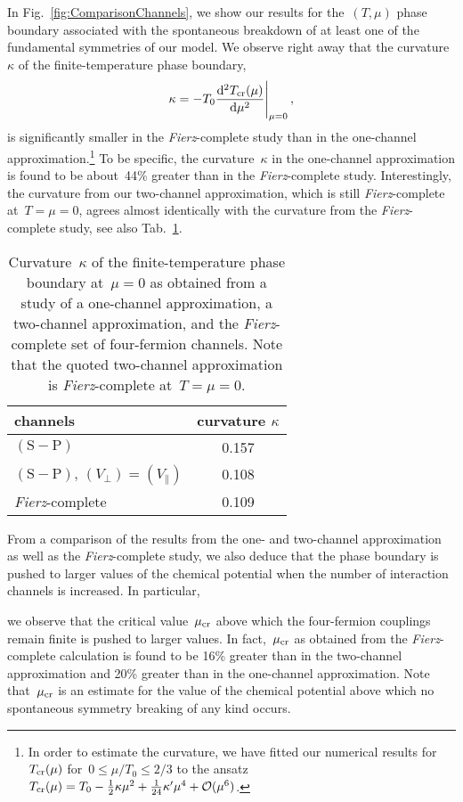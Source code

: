 \documentclass[prd,english,preprintnumbers,amsmath,amssymb,nofootinbib,twocolumn,superscriptaddress]{revtex4-1}
\newcommand{\be}{\begin{eqnarray}}
\newcommand{\ee}{\end{eqnarray}}
\begin{document}
{In Fig.~\ref{fig:ComparisonChannels}, we show our results for the~$(T,\mu)$ phase boundary 
associated with the spontaneous breakdown of at least one of the fundamental symmetries of our model. 
We observe right away that
the curvature~$\kappa$ of the finite-temperature phase {boundary,
%
\be
\kappa = -{T_0}\frac{{\rm d}^2 T_{\rm cr}(\mu)}{{\rm d}\mu^2}\Bigg|_{\mu=0}\,,
\ee
%
is} significantly smaller in the {\it Fierz}-complete study than in the  
one-channel approximation.\footnote{In order to estimate the curvature, we have
fitted our numerical results for~$T_{\rm cr}(\mu)$ for~$0\leq \mu/T_0 \leq 2/3$ to the 
{ansatz~$T_{\rm cr}(\mu) = T_0 - \frac{1}{2}\kappa \mu^2 + \frac{1}{24}\kappa^{\prime}\mu^4 + {\mathcal O}(\mu^6)$.}}
To be specific,  
the curvature~$\kappa$ in the one-channel approximation is found to be 
{about~44\% greater} than in the {\it Fierz}-complete study. Interestingly, 
the curvature from our two-channel approximation, which is still {\it Fierz}-complete at~$T=\mu=0$,
agrees almost identically with the curvature from the {\it Fierz}-complete {study, see also Tab.~\ref{tab:curvature}.}
%
\begin{table}[t]
\begin{tabular}{l | c}
\hline\hline
 channels &  curvature $\kappa$ \\
 \hline
$( \text{S} - \text{P})$ & 0.157\\
$( \text{S} - \text{P})$, $(V_{\perp})=(V_{\parallel})$& 0.108\\
{\it Fierz}-complete &  0.109\\
 \hline\hline
\end{tabular}
\caption{\label{tab:curvature}{Curvature~$\kappa$ of the finite-temperature 
phase boundary at~$\mu=0$ as obtained
from a study of a one-channel approximation, a two-channel approximation, and the {\it Fierz}-complete
set of four-fermion channels.  Note that the quoted two-channel approximation is {\it Fierz}-complete 
at~$T=\mu=0$.}} 
\end{table}
%

From a comparison of the results from the one- and two-channel 
approximation as well as the {\it Fierz}-complete study, we also deduce that the phase boundary
is pushed to larger values of the chemical potential when the number of interaction channels 
is increased. In particular, {we observe that the critical value~$\mu_{\rm cr}$ above which 
{the four-fermion couplings remain finite} 
is pushed to larger values. In fact,~$\mu_{\rm cr}$ 
as obtained from the {\it Fierz}-complete calculation is found
to be 16\% greater than in the two-channel approximation and 20\% greater than in the one-channel approximation.
{Note that~$\mu_{\rm cr}$ is an estimate for the value of the chemical potential
above which no spontaneous symmetry breaking of any kind occurs.}

}}
\end{document}
